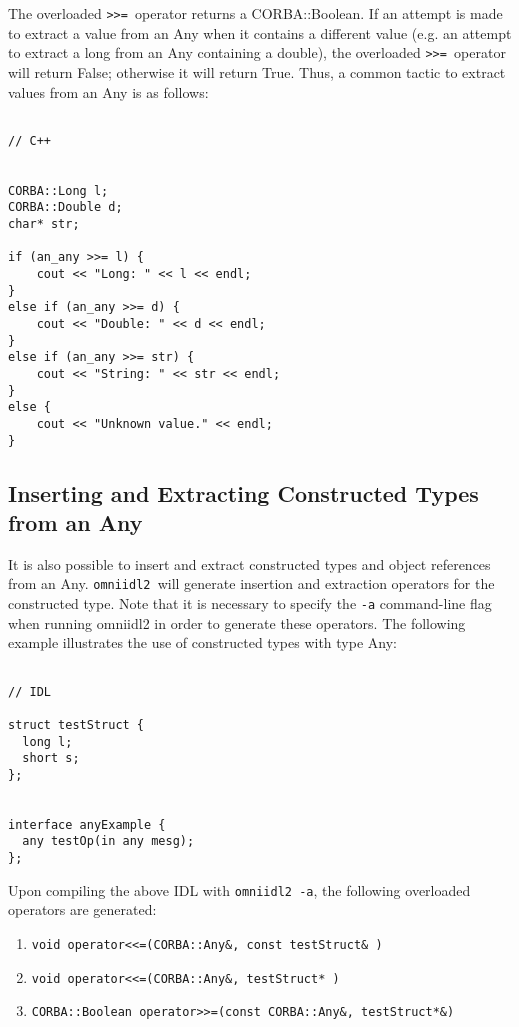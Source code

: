 \documentclass[11pt,twoside,onecolumn]{book}
\begin{document}
The overloaded {\tt >>= }operator returns a CORBA::Boolean. If an attempt is 
made to extract a value from an Any when it contains a different value (e.g. 
an attempt to extract a long from an Any containing a double), the overloaded 
{\tt >>= }operator will return False; otherwise it will return True. Thus, a 
common tactic to extract values from an Any is as follows:
\pagebreak

{\small
\begin{verbatim}

// C++


CORBA::Long l;
CORBA::Double d;
char* str;

if (an_any >>= l) {
    cout << "Long: " << l << endl;
}
else if (an_any >>= d) {
    cout << "Double: " << d << endl;
}
else if (an_any >>= str) {
    cout << "String: " << str << endl;
}
else {
    cout << "Unknown value." << endl;
}

\end{verbatim}
}


\subsection{Inserting and Extracting Constructed Types from an Any}

It is also possible to insert and extract constructed types and object
references from an Any. {\tt omniidl2 }will generate insertion and extraction 
operators for the constructed type. Note that it is necessary to specify
the {\tt -a} command-line flag when running omniidl2 in order to generate
these operators. The following example illustrates the use of constructed types
with type Any:

{\small
\begin{verbatim}

// IDL

struct testStruct {
  long l;
  short s;
};


interface anyExample {
  any testOp(in any mesg);
};

\end{verbatim}
}

Upon compiling the above IDL with {\tt omniidl2 -a}, the following overloaded 
operators are generated: 

\begin{enumerate}
\item {\tt void operator<<=(CORBA::Any\&, const testStruct\& ) }
\item {\tt void operator<<=(CORBA::Any\&, testStruct* ) }
\item {\tt CORBA::Boolean operator>>=(const CORBA::Any\&, testStruct*\&) }
\end{enumerate}
\end{document}
